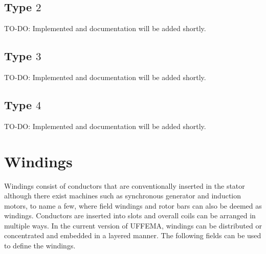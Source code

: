 \documentclass[justified]{tufte-book} %
\begin{document}
\section[Type 2]{Type $2$}
TO-DO: Implemented and documentation will be added shortly.

\section[Type 3]{Type $3$}
TO-DO: Implemented and documentation will be added shortly.

\section[Type 4]{Type $4$}
TO-DO: Implemented and documentation will be added shortly.

\chapter{Windings}\label{ch:windings}
\begin{fullwidth}
Windings consist of conductors that are conventionally inserted in the stator although there exist machines such as synchronous generator and induction motors, to name a few, where field windings and rotor bars can also be deemed as windings. 
Conductors are inserted into slots and overall coils can be arranged in multiple ways. In the current version of UFFEMA, windings can be distributed or concentrated and embedded in a layered manner.
The following fields can be used to define the windings.   
\end{fullwidth}
\end{document}
